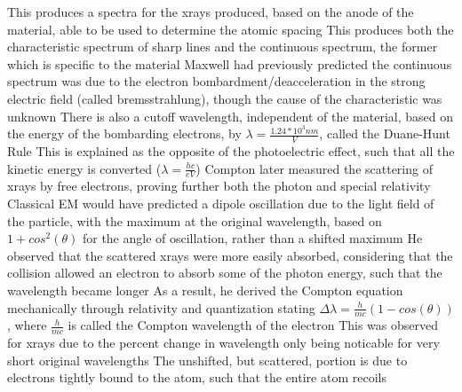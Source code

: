 \documentclass[11 pt, twoside]{article}
\newenvironment{outline*}
{
	\begin{outline}[enumerate]
	}
	{\end{outline}
}
\begin{document}
\begin{outline*}
	\2 This produces a spectra for the xrays produced, based on the anode of the material, able to be used to determine the atomic spacing
		\3 This produces both the characteristic spectrum of sharp lines and the continuous spectrum, the former which is specific to the material
			\4 Maxwell had previously predicted the continuous spectrum was due to the electron bombardment/deacceleration in the strong electric field (called bremsstrahlung), though the cause of the characteristic was unknown
		\3 There is also a cutoff wavelength, independent of the material, based on the energy of the bombarding electrons, by $\lambda = \frac{1.24 * 10^3 nm}{V}$, called the Duane-Hunt Rule
			\4 This is explained as the opposite of the photoelectric effect, such that all the kinetic energy is converted ($\lambda = \frac{hc}{eV}$)
\1 Compton later measured the scattering of xrays by free electrons, proving further both the photon and special relativity
	\2 Classical EM would have predicted a dipole oscillation due to the light field of the particle, with the maximum at the original wavelength, based on $1 + cos^2(\theta)$ for the angle of oscillation, rather than a shifted maximum
	\2 He observed that the scattered xrays were more easily absorbed, considering that the collision allowed an electron to absorb some of the photon energy, such that the wavelength became longer
	\2 As a result, he derived the Compton equation mechanically through relativity and quantization stating $\Delta \lambda = \frac{h}{mc}(1 - cos(\theta))$, where $\frac{h}{mc}$ is called the Compton wavelength of the electron
		\3 This was observed for xrays due to the percent change in wavelength only being noticable for very short original wavelengths
		\3 The unshifted, but scattered, portion is due to electrons tightly bound to the atom, such that the entire atom recoils
\end{outline*}
\end{document}
